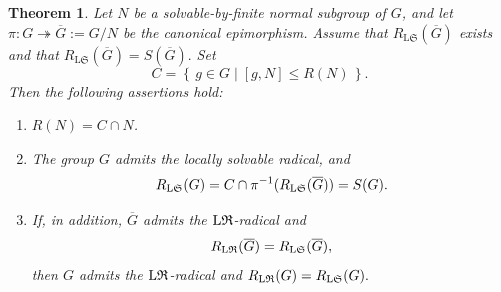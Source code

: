 \documentclass[11pt, reqno]{amsart}
\numberwithin{equation}{section}
\newtheorem{theorem}{Theorem}[section]
\theoremstyle{definition}
\numberwithin{equation}{section}
\begin{document}
\begin{theorem}\label{prop:main_tool}
Let $N$ be a solvable-by-finite normal subgroup of $G$, and let
  $\pi\colon G\twoheadrightarrow \overline{G}:=G/N$ be the canonical epimorphism. Assume that $R_{\mathrm{L}\mathfrak{S}}(\overline{G})$ exists and that $R_{\mathrm{L}\mathfrak{S}}(\overline{G})=S(\overline{G}).$ Set $$C=\left\{\,g\in G\mid [g,N]\leq R(N)\,\right\}.$$ Then the following assertions hold:
\begin{enumerate}[label = \textup{(\arabic*)}]
    \item $R(N) = C \cap N$.
    \item The group $G$ admits the locally solvable radical, and 
    $$ R_{\textup{L}\mathfrak{S}}(G) = C \cap \pi^{-1}(R_{\textup{L}\mathfrak{S}}(\overline{G}))=S(G). $$
    \item If, in addition, $\overline{G}$ admits the $\textup{L}\mathfrak{R}$-radical and $$ R_{\textup{L}\mathfrak{R}}(\overline{G})=R_{\textup{L}\mathfrak{S}}(\overline{G}), $$ then $G$ admits the $\textup{L}\mathfrak{R}$-radical and $ R_{\textup{L}\mathfrak{R}}(G) = R_{\textup{L}\mathfrak{S}}(G). $
\end{enumerate}
\end{theorem}
    
\end{document}
